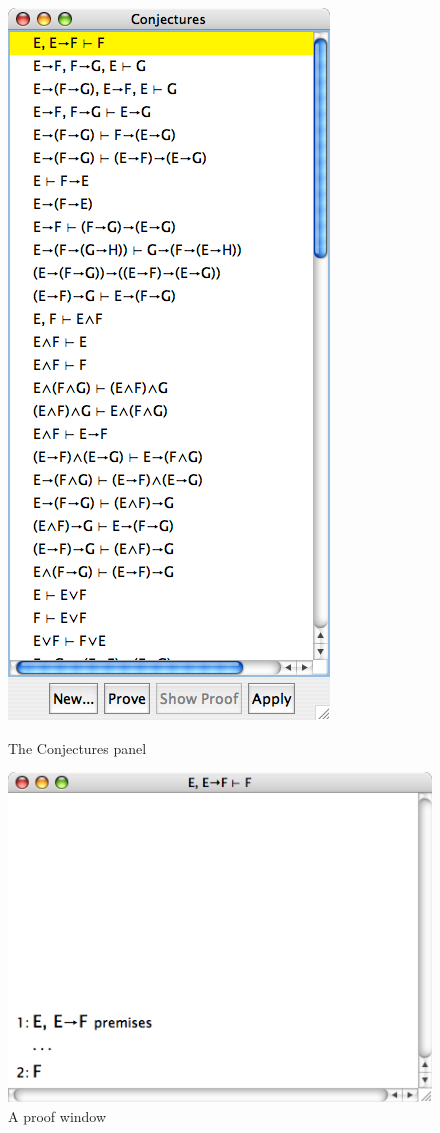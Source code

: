 \documentclass[11pt]{book}
\begin{document}
\begin{figure}
\centering
\parbox[b]{165pt}{\centering
\includegraphics[scale=0.5]{pics/conjecturespanel.png}
\caption{The Conjectures panel}
\label{fig:conjecturespanel}}
\qquad
\parbox[b]{230pt}{\centering
\includegraphics[scale=0.5]{pics/firstproofwindow.png}
\caption{A proof window}
\label{fig:firstproofwindow}}
\end{figure}
\end{document}
